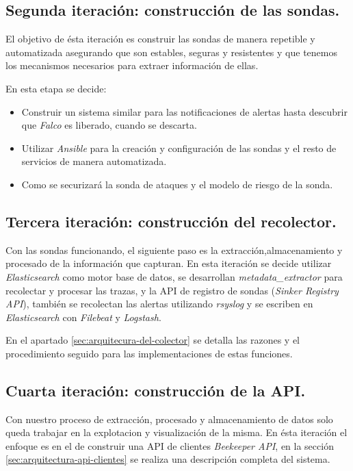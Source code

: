 \subsection{Segunda iteración: construcción de las sondas.}

El objetivo de ésta iteración es construir las sondas de manera repetible y automatizada asegurando que son estables,
seguras y resistentes y que tenemos los mecanismos necesarios para extraer información de ellas.

En esta etapa se decide:

\begin{itemize}
    \item Construir un sistema similar para las notificaciones de alertas hasta descubrir que \emph{Falco} es liberado, cuando se descarta.
    \item Utilizar \emph{Ansible} para la creación y configuración de las sondas y el resto de servicios de manera automatizada.
    \item Como se securizará la sonda de ataques y el modelo de riesgo de la sonda.
\end{itemize}

\subsection{Tercera iteración: construcción del recolector.}

Con las sondas funcionando, el siguiente paso es la extracción,almacenamiento y procesado de la información que capturan. En esta iteración
se decide utilizar \emph{Elasticsearch} como motor base de datos, se desarrollan \emph{metadata\_extractor} para recolectar y procesar las trazas, y 
la API de registro de sondas (\emph{Sinker Registry API}), también se recolectan las alertas utilizando \emph{rsyslog} y se escriben en \emph{Elasticsearch}
con \emph{Filebeat} y \emph{Logstash}.

En el apartado \ref{sec:arquitecura-del-colector} se detalla las razones y el procedimiento seguido para las implementaciones de estas funciones.

\subsection{Cuarta iteración: construcción de la API.}

Con nuestro proceso de extracción, procesado y almacenamiento de datos solo queda trabajar en la explotacion y visualización de la misma. En ésta iteración
el enfoque es en el de construir una API de clientes \emph{Beekeeper API}, en la sección \ref{sec:arquitectura-api-clientes} se realiza
una descripción completa del sistema.

